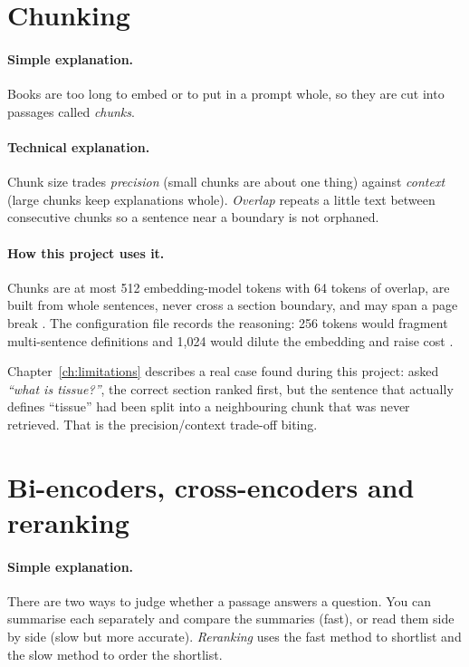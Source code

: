 \section{Chunking}

\paragraph{Simple explanation.} Books are too long to embed or to put in a prompt whole, so they are cut into passages called \emph{chunks}.

\paragraph{Technical explanation.} Chunk size trades \emph{precision} (small chunks are about one thing) against \emph{context} (large chunks keep explanations whole). \emph{Overlap} repeats a little text between consecutive chunks so a sentence near a boundary is not orphaned.

\paragraph{How this project uses it.} Chunks are at most 512 embedding-model tokens with 64 tokens of overlap, are built from whole sentences, never cross a section boundary, and may span a page break . The configuration file records the reasoning: 256 tokens would fragment multi-sentence definitions and 1,024 would dilute the embedding and raise cost .

\begin{example}
Chapter~\ref{ch:limitations} describes a real case found during this project: asked \emph{``what is tissue?''}, the correct section ranked first, but the sentence that actually defines ``tissue'' had been split into a neighbouring chunk that was never retrieved. That is the precision/context trade-off biting.
\end{example}

\section{Bi-encoders, cross-encoders and reranking}
\label{sec:crossencoder}

\paragraph{Simple explanation.} There are two ways to judge whether a passage answers a question. You can summarise each separately and compare the summaries (fast), or read them side by side (slow but more accurate). \emph{Reranking} uses the fast method to shortlist and the slow method to order the shortlist.

